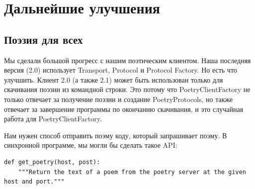 

 
\section{Дальнейшие улучшения\label{sec:part6}}

\subsection{Поэзия для всех}


Мы сделали большой прогресс с нашим поэтическим клиентом. 
Наша последняя версия (2.0) использует Transport, Protocol и 
Protocol Factory. Но есть что улучшить. 
Клиент 2.0 (а также 2.1) может быть использован только для 
скачивания поэзии из командной строки. Это потому что 
PoetryClientFactory не только отвечает за получение поэзии и 
создание PoetryProtocols, но 
также отвечает за завершение программы по окончанию скачивания, 
и это случайная работа для PoetryClientFactory.



Нам нужен способ отправить поэму коду, который 
запрашивает поэму. В синхронной программе, мы могли бы 
сделать такое API:

\begin{scriptsize}\begin{verbatim}
def get_poetry(host, post):
    """Return the text of a poem from the poetry server at the given host and port."""
\end{verbatim}\end{scriptsize}


